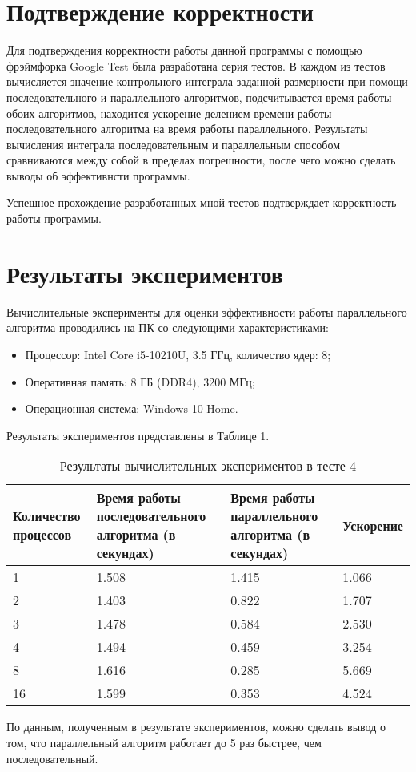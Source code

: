 \documentclass{report}
\begin{document}
\section*{Подтверждение корректности}
Для подтверждения корректности работы данной программы с помощью фрэймфорка Google Test была разработана серия тестов. В каждом из тестов вычисляется значение контрольного  интеграла заданной размерности при помощи последовательного и параллельного алгоритмов, подсчитывается время работы обоих алгоритмов, находится ускорение делением времени работы последовательного алгоритма на время работы параллельного. Результаты вычисления интеграла последовательным и параллельным способом сравниваются между собой в пределах погрешности, после чего можно сделать выводы об эффективнсти программы.

\par Успешное прохождение разработанных мной тестов подтверждает корректность работы программы.
\newpage

\section*{Результаты экспериментов}
Вычислительные эксперименты для оценки эффективности работы параллельного алгоритма проводились на ПК со следующими характеристиками:
\begin{itemize}
\item Процессор: Intel Core i5-10210U, 3.5 ГГц, количество ядер: 8;
\item Оперативная память: 8 ГБ (DDR4), 3200  МГц;
\item Операционная система: Windows 10 Home.
\end{itemize}

\par Результаты экспериментов представлены в Таблице 1.

\begin{table}[!h]
\caption{Результаты вычислительных экспериментов в тесте 4}
\centering
\begin{tabular}{| p{2cm} | p{3cm} | p{4cm} | p{2cm} |}
\hline
Количество процессов & Время работы последовательного алгоритма (в секундах) & Время работы параллельного алгоритма (в секундах) & Ускорение  \\[5pt]
\hline
1        & 1.508        & 1.415     & 1.066       \\
2        & 1.403        & 0.822     & 1.707       \\
3        & 1.478        & 0.584     & 2.530       \\
4        & 1.494        & 0.459     & 3.254       \\
8        & 1.616        & 0.285     & 5.669	    \\
16        & 1.599        & 0.353     & 4.524	  \\
\hline
\end{tabular}
\end{table}
По данным, полученным в результате экспериментов, можно сделать вывод о том,
что параллельный алгоритм работает до 5 раз быстрее, чем последовательный.
\end{document}

